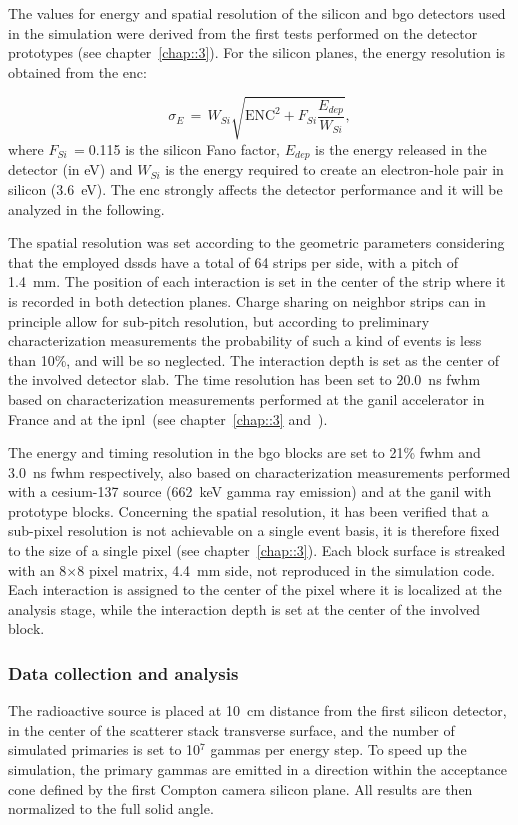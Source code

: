 The values for energy and spatial resolution of the silicon and \gls{bgo} detectors used in the simulation were derived from the first tests performed on the detector prototypes (see chapter~\ref{chap::3}). For the silicon planes, the energy resolution is obtained from the \gls{enc}:

\begin{equation}
\sigma_{E}\, = \,W_{Si} \sqrt{\mathrm{ENC}^{2} + F_{Si}\frac{E_{dep}}{W_{Si}}},
\label{chap5::eq::E_res_ENC}
\end{equation}
where $F_{Si}\,=$0.115 is the silicon Fano factor, $E_{dep}$ is the energy released in the detector (in eV) and $W_{Si}$ is the energy required to create an electron-hole pair in silicon (3.6~eV). The \gls{enc} strongly affects the detector performance and it will be analyzed in the following. 

The spatial resolution was set according to the geometric parameters considering that the employed \glspl{dssd} have a total of 64 strips per side, with a pitch of 1.4~mm. The position of each interaction is set in the center of the strip where it is recorded in both detection planes. Charge sharing on neighbor strips can in principle allow for sub-pitch resolution, but according to preliminary characterization measurements the probability of such a kind of events is less than 10\%, and will be so neglected. The interaction depth is set as the center of the involved detector slab. The time resolution has been set to 20.0~ns \gls{fwhm} based on characterization measurements performed at the \gls{ganil} accelerator in France and at the \gls{ipnl}~(see chapter~\ref{chap::3} and~\cite{Ley2015}).

The energy and timing resolution in the \gls{bgo} blocks are set to 21\% \gls{fwhm} and 3.0~ns \gls{fwhm} respectively, also based on characterization measurements performed with a cesium-137 source (662~keV gamma ray emission) and at the \gls{ganil} with prototype blocks. Concerning the spatial resolution, it has been verified that a sub-pixel resolution is not achievable on a single event basis, it is therefore fixed to the size of a single pixel (see chapter~\ref{chap::3}). Each block surface is streaked with an 8$\times$8 pixel matrix, 4.4~mm side, not reproduced in the simulation code. Each interaction is assigned to the center of the pixel where it is localized at the analysis stage, while the interaction depth is set at the center of the involved block.

\subsubsection{Data collection and analysis}\label{chap5::subsubsec::CC_analysis}
The radioactive source is placed at 10~cm distance from the first silicon detector, in the center of the scatterer stack transverse surface, and the number of simulated primaries is set to 10$^{7}$ gammas per energy step. To speed up the simulation, the primary gammas are emitted in a direction within the acceptance cone defined by the first Compton camera silicon plane. All results are then normalized to the full solid angle. 

